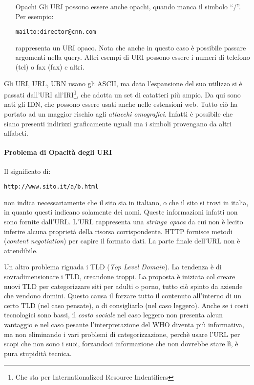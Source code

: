 \begin{itemize}
\begin{itemize}
\item[Opachi]Gli URI possono essere anche opachi, quando manca il simbolo ``/''. Per esempio:
\begin{verbatim}
mailto:director@cnn.com
\end{verbatim}
rappresenta un URI opaco. Nota che anche in questo caso \`e possibile passare argomenti nella query. Altri esempi di URI possono essere i numeri di telefono (tel) o fax (fax) e altri.

  
\end{itemize}

\end{itemize}

Gli URI, URL, URN usano gli ASCII, ma dato l'espansione del suo utilizzo si \`e passati dall'URI all'IRI\footnote{Che sta per Internationalized Resource Indentifiers}, che adotta un set di catatteri pi\`u ampio. Da qui sono nati gli IDN, che possono essere usati anche nelle estensioni web. Tutto ci\`o ha portato ad un maggior rischio agli \textit{attacchi omografici}. Infatti \`e possibile che siano presenti indirizzi graficamente uguali ma i simboli provengano da altri alfabeti.

\paragraph*{Problema di Opacit\`a degli URI}Il significato di:
\begin{verbatim}
http://www.sito.it/a/b.html
\end{verbatim}
non indica necessariamente che il sito sia in italiano, o che il sito si trovi in italia, in quanto questi indicano solamente dei nomi. Queste informazioni infatti non sono fornite dall'URL. L'URL rappresenta una \textit{stringa opaca} da cui non \`e lecito inferire alcuna propriet\`a della risorsa corrispondente. HTTP fornisce metodi (\textit{content negotiation}) per capire il formato dati. La parte finale dell'URL non \`e attendibile.

Un altro problema riguada i TLD (\textit{Top Level Domain}). La tendenza \`e di sovradimensionare i TLD, creandone troppi. La proposta \`e iniziata col creare nuovi TLD per categorizzare siti per adulti o porno, tutto ci\`o spinto da aziende che vendono domini. Questo causa il forzare tutto il contenuto all'interno di un certo TLD (nel caso pensate), o di consigliarlo (nel caso leggero). Anche se i costi tecnologici sono bassi, il \textit{costo sociale} nel caso leggero non presenta alcun vantaggio e nel caso pesante l'interpretazione del WHO diventa pi\`u informativa, ma non eliminando i vari problemi di categorizzazione, perch\`e usare l'URL per scopi che non sono i suoi, forzandoci informazione che non dovrebbe stare l\`i, \`e pura stupidit\`a tecnica.


